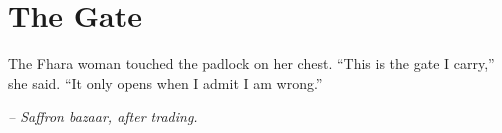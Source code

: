\chapter*{The Gate}

The Fhara woman touched the padlock on her chest. “This is the gate I carry,” she said. “It only opens when I admit I am wrong.”

\smallskip

\noindent \textit{– Saffron bazaar, after trading.}

